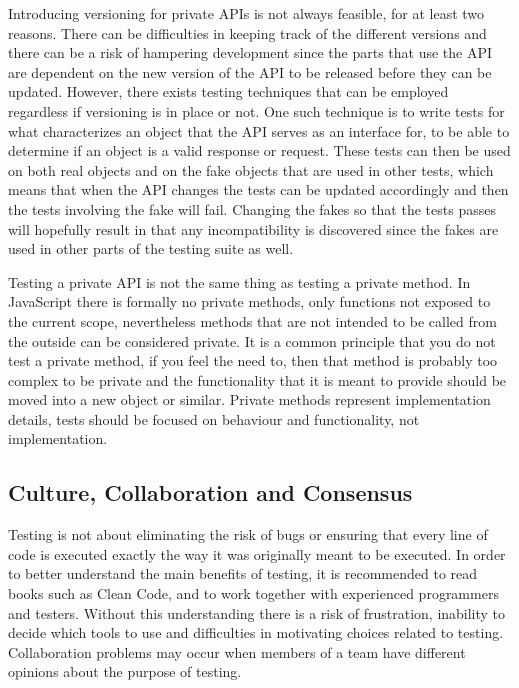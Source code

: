 \documentclass[11pt]{article}
\begin{document}
Introducing versioning for private APIs is not always feasible, for at least two reasons. There can be difficulties in keeping track of the different versions and there can be a risk of hampering development since the parts that use the API are dependent on the new version of the API to be released before they can be updated. However, there exists testing techniques that can be employed regardless if versioning is in place or not. One such technique is to write tests for what characterizes an object that the API serves as an interface for, to be able to determine if an object is a valid response or request. These tests can then be used on both real objects and on the fake objects that are used in other tests, which means that when the API changes the tests can be updated accordingly and then the tests involving the fake will fail. Changing the fakes so that the tests passes will hopefully result in that any incompatibility is discovered since the fakes are used in other parts of the testing suite as well. \cite[question~34]{Edelstam}

Testing a private API is not the same thing as testing a private method. In JavaScript there is formally no private methods, only functions not exposed to the current scope, nevertheless methods that are not intended to be called from the outside can be considered private. It is a common principle that you do not test a private method, if you feel the need to, then that method is probably too complex to be private and the functionality that it is meant to provide should be moved into a new object or similar. Private methods represent implementation details, tests should be focused on behaviour and functionality, not implementation. \cite[questions~62-63]{Edelstam}

\subsection{Culture, Collaboration and Consensus}
\label{sec:ccc}

Testing is not about eliminating the risk of bugs or ensuring that every line of code is executed exactly the way it was originally meant to be executed. In order to better understand the main benefits of testing, it is recommended to read books such as Clean Code, and to work together with experienced programmers and testers. Without this understanding there is a risk of frustration, inability to decide which tools to use and difficulties in motivating choices related to testing. Collaboration problems may occur when members of a team have different opinions about the purpose of testing. \cite[question~38]{Edelstam}
\end{document}
